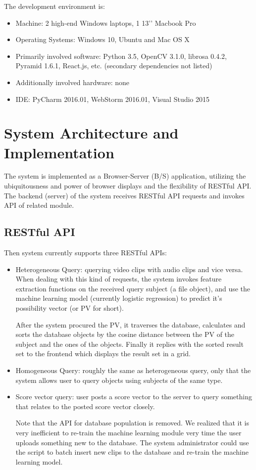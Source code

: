 \documentclass{report}
\begin{document}
The development environment is:
\begin{itemize}
  \item Machine: 2 high-end Windows laptops, 1 13’’ Macbook Pro
  \item Operating Systems: Windows 10, Ubuntu and Mac OS X
  \item Primarily involved software: Python 3.5, OpenCV 3.1.0, librosa 0.4.2, Pyramid 1.6.1, React.js, etc. (secondary dependencies not listed)
  \item Additionally involved hardware: none
  \item IDE: PyCharm 2016.01, WebStorm 2016.01, Visual Studio 2015
\end{itemize}

\section{System Architecture and Implementation}

The system is implemented as a Browser-Server (B/S) application, utilizing the ubiquitousness and power of browser displays and the flexibility of RESTful API. The backend (server) of the system receives RESTful API requests and invokes API of related module.

\subsection{RESTful API}

Then system currently supports three RESTful APIs:
\begin{itemize}
\item Heterogeneous Query: querying video clips with audio clips and vice versa. When dealing with this kind of requests, the system invokes feature extraction functions on the received query subject (a file object), and use the machine learning model (currently logistic regression) to predict it's possibility vector (or PV for short).

After the system procured the PV, it traverses the database, calculates and sorts the database objects by the cosine distance between the PV of the subject and the ones of the objects. Finally it replies with the sorted result set to the frontend which displays the result set in a grid.

\item Homogeneous Query: roughly the same as heterogeneous query, only that the system allows user to query objects using subjects of the same type.

\item Score vector query: user posts a score vector to the server to query something that relates to the posted score vector closely.

Note that the API for database population is removed. We realized that it is very inefficient to re-train the machine learning module very time the user uploads something new to the database. The system administrator could use the script to batch insert new clips to the database and re-train the machine learning model.

\end{itemize}
\end{document}
